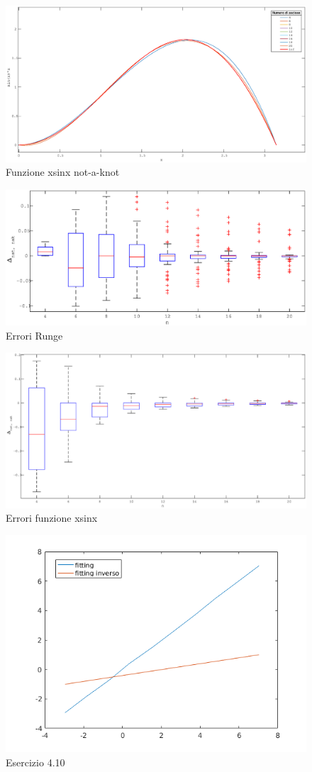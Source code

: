 \begin{figure}[h]
\caption{Funzione xsinx not-a-knot}
\label{sin_nak}
\includegraphics[width=\textwidth]{plot/sin_nak}
\end{figure}
\begin{figure}[h]
\caption{Errori Runge}
\label{erunge_nak}
\includegraphics[width=\textwidth]{plot/errors}
\end{figure}
\begin{figure}[h]
\caption{Errori funzione xsinx}
\label{esin_nak}
\includegraphics[width=\textwidth]{plot/errors_sin}
\end{figure}
\begin{figure}[h]
\caption{Esercizio 4.10}
\label{fitting}
\includegraphics[width=\textwidth]{plot/fittinginv}
\end{figure}